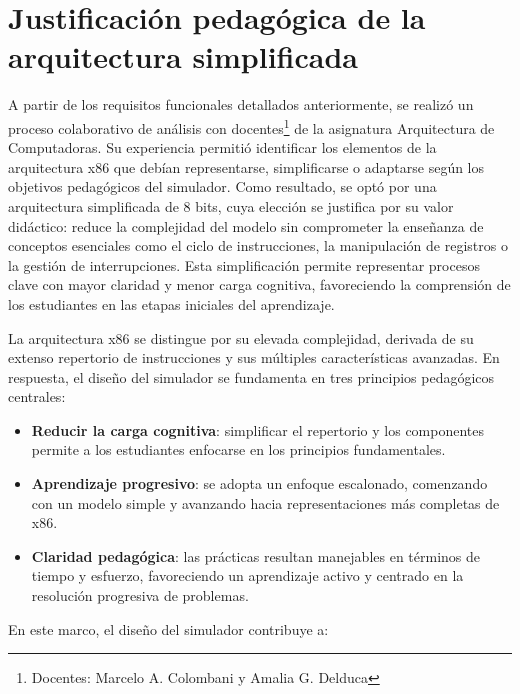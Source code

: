 \documentclass[12pt,oneside]{templates/unerthesis}
\providecommand{\tightlist}{%
  \setlength{\itemsep}{0pt}\setlength{\parskip}{0pt}}
\begin{document}
\hypertarget{justificaciuxf3n-pedaguxf3gica-de-la-arquitectura-simplificada}{%
\section{Justificación pedagógica de la arquitectura simplificada}\label{justificaciuxf3n-pedaguxf3gica-de-la-arquitectura-simplificada}}

A partir de los requisitos funcionales detallados anteriormente, se realizó un proceso colaborativo de análisis con docentes\footnote{Docentes: Marcelo A. Colombani y Amalia G. Delduca} de la asignatura Arquitectura de Computadoras. Su experiencia permitió identificar los elementos de la arquitectura x86 que debían representarse, simplificarse o adaptarse según los objetivos pedagógicos del simulador. Como resultado, se optó por una arquitectura simplificada de 8 bits, cuya elección se justifica por su valor didáctico: reduce la complejidad del modelo sin comprometer la enseñanza de conceptos esenciales como el ciclo de instrucciones, la manipulación de registros o la gestión de interrupciones. Esta simplificación permite representar procesos clave con mayor claridad y menor carga cognitiva, favoreciendo la comprensión de los estudiantes en las etapas iniciales del aprendizaje.

La arquitectura x86 se distingue por su elevada complejidad, derivada de su extenso repertorio de instrucciones y sus múltiples características avanzadas. En respuesta, el diseño del simulador se fundamenta en tres principios pedagógicos centrales:

\begin{itemize}
\tightlist
\item
  \textbf{Reducir la carga cognitiva}: simplificar el repertorio y los componentes permite a los estudiantes enfocarse en los principios fundamentales.\\
\item
  \textbf{Aprendizaje progresivo}: se adopta un enfoque escalonado, comenzando con un modelo simple y avanzando hacia representaciones más completas de x86.\\
\item
  \textbf{Claridad pedagógica}: las prácticas resultan manejables en términos de tiempo y esfuerzo, favoreciendo un aprendizaje activo y centrado en la resolución progresiva de problemas.
\end{itemize}

En este marco, el diseño del simulador contribuye a:
\end{document}
